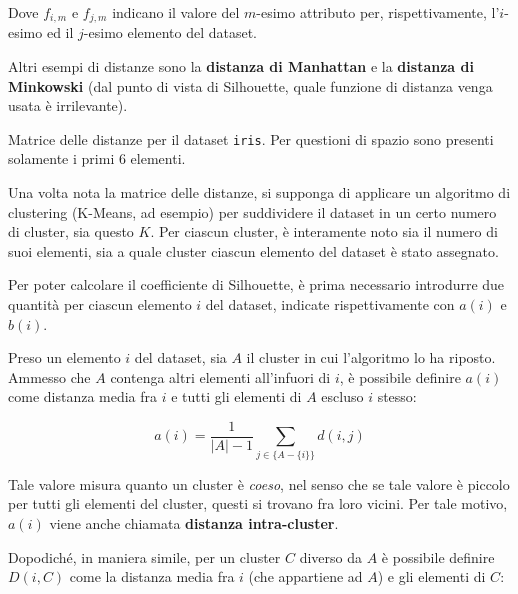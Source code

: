 \documentclass[12pt]{report}
\begin{document}
			Dove $f_{i, m}$ e $f_{j, m}$ indicano il valore del $m$-esimo
			attributo per, rispettivamente, l'$i$-esimo ed il $j$-esimo
			elemento del dataset.

			Altri esempi di distanze sono la \textbf{distanza di Manhattan}
			e la \textbf{distanza di Minkowski} (dal punto di vista di
			Silhouette, quale funzione di distanza venga usata è irrilevante).

			\begin{table}[h]
				\centering
				\caption{Matrice delle distanze per il dataset \texttt{iris}. Per questioni
				di spazio sono presenti solamente i primi 6 elementi.}
				\label{tab:dist}
			\end{table}

			Una volta nota la matrice delle distanze, si supponga di applicare
			un algoritmo di clustering (K-Means, ad esempio) per suddividere il
			dataset in un certo numero di cluster, sia questo $K$. Per ciascun
			cluster, è interamente noto sia il numero di suoi elementi, sia
			a quale cluster ciascun elemento del dataset è stato assegnato.

			Per poter calcolare il coefficiente di Silhouette, è prima necessario
			introdurre due quantità per ciascun elemento $i$ del dataset, indicate
			rispettivamente con $a(i)$ e $b(i)$.

			Preso un elemento $i$ del dataset, sia $A$ il cluster in cui l'algoritmo
			lo ha riposto. Ammesso che $A$ contenga altri elementi all'infuori di $i$,
			è possibile definire $a(i)$ come distanza media fra $i$ e tutti gli elementi
			di $A$ escluso $i$ stesso:

			\begin{equation}
				a(i) = \frac{1}{|A| - 1} \sum_{j \in \{A - \{i\}\}} d(i, j)
			\end{equation}

			Tale valore misura quanto un cluster è \textit{coeso}, nel senso
			che se tale valore è piccolo per tutti gli elementi del cluster,
			questi si trovano fra loro vicini. Per tale motivo, $a(i)$ viene
			anche chiamata \textbf{distanza intra-cluster}.

			Dopodiché, in maniera simile, per un cluster $C$ diverso da $A$
			è possibile definire $D(i, C)$ come la distanza media fra $i$
			(che appartiene ad $A$) e gli elementi di $C$:
\end{document}
